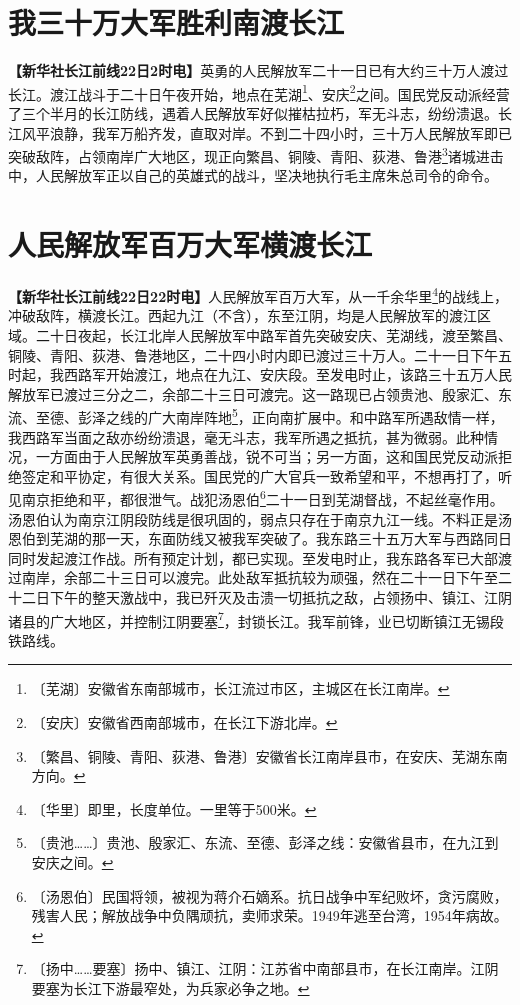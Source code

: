 \documentclass[12pt,UTF-8,openany]{ctexbook}
\renewcommand{\footnotesize}{\fontsize{8.5pt}{10.5pt}\selectfont}
\begin{document}
\begin{normalsize}
    
    \section{我三十万大军胜利南渡长江}
    
    {\footnotesize\textbf{【新华社长江前线22日2时电】}}英勇的人民解放军二十一日已有大约三十万人渡过长江。渡江战斗于二十日午夜开始，地点在芜湖\footnote{〔芜湖〕安徽省东南部城市，长江流过市区，主城区在长江南岸。}、安庆\footnote{〔安庆〕安徽省西南部城市，在长江下游北岸。}之间。国民党反动派经营了三个半月的长江防线，遇着人民解放军好似摧枯拉朽，军无斗志，纷纷溃退。长江风平浪静，我军万船齐发，直取对岸。不到二十四小时，三十万人民解放军即已突破敌阵，占领南岸广大地区，现正向繁昌、铜陵、青阳、荻港、鲁港\footnote{〔繁昌、铜陵、青阳、荻港、鲁港〕安徽省长江南岸县市，在安庆、芜湖东南方向。}诸城进击中，人民解放军正以自己的英雄式的战斗，坚决地执行毛主席朱总司令的命令。
    
    \section{人民解放军百万大军横渡长江}
    
    {\footnotesize\textbf{【新华社长江前线22日22时电】}}人民解放军百万大军，从一千余华里\footnote{〔华里〕即里，长度单位。一里等于500米。}的战线上，冲破敌阵，横渡长江。西起九江（不含），东至江阴，均是人民解放军的渡江区域。二十日夜起，长江北岸人民解放军中路军首先突破安庆、芜湖线，渡至繁昌、铜陵、青阳、荻港、鲁港地区，二十四小时内即已渡过三十万人。二十一日下午五时起，我西路军开始渡江，地点在九江、安庆段。至发电时止，该路三十五万人民解放军已渡过三分之二，余部二十三日可渡完。这一路现已占领贵池、殷家汇、东流、至德、彭泽之线的广大南岸阵地\footnote{〔贵池……〕贵池、殷家汇、东流、至德、彭泽之线：安徽省县市，在九江到安庆之间。}，正向南扩展中。和中路军所遇敌情一样，我西路军当面之敌亦纷纷溃退，毫无斗志，我军所遇之抵抗，甚为微弱。此种情况，一方面由于人民解放军英勇善战，锐不可当；另一方面，这和国民党反动派拒绝签定和平协定，有很大关系。国民党的广大官兵一致希望和平，不想再打了，听见南京拒绝和平，都很泄气。战犯汤恩伯\footnote{〔汤恩伯〕民国将领，被视为蒋介石嫡系。抗日战争中军纪败坏，贪污腐败，残害人民；解放战争中负隅顽抗，卖师求荣。1949年逃至台湾，1954年病故。}二十一日到芜湖督战，不起丝毫作用。汤恩伯认为南京江阴段防线是很巩固的，弱点只存在于南京九江一线。不料正是汤恩伯到芜湖的那一天，东面防线又被我军突破了。我东路三十五万大军与西路同日同时发起渡江作战。所有预定计划，都已实现。至发电时止，我东路各军已大部渡过南岸，余部二十三日可以渡完。此处敌军抵抗较为顽强，然在二十一日下午至二十二日下午的整天激战中，我已歼灭及击溃一切抵抗之敌，占领扬中、镇江、江阴诸县的广大地区，并控制江阴要塞\footnote{〔扬中……要塞〕扬中、镇江、江阴：江苏省中南部县市，在长江南岸。江阴要塞为长江下游最窄处，为兵家必争之地。}，封锁长江。我军前锋，业已切断镇江无锡段铁路线。
    
\end{normalsize}
\end{document}
